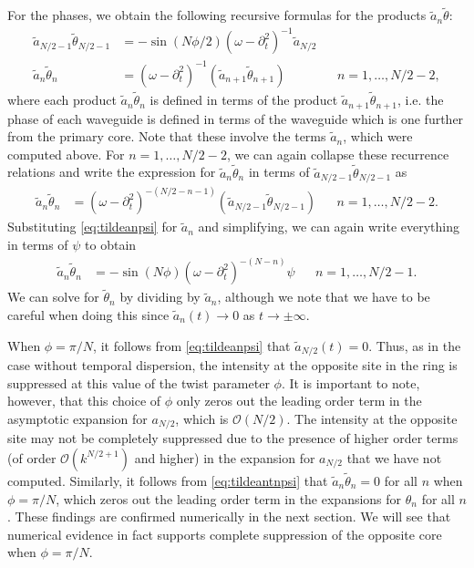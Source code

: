 \documentclass[11pt,reqno]{amsart}
\begin{document}
For the phases, we obtain the following recursive formulas for the products $\widetilde{a}_n\widetilde{\theta}$:
\begin{equation}\label{eq:tildeantn}
\begin{aligned}
\widetilde{a}_{N/2-1}\widetilde{\theta}_{N/2-1} &= -\sin(N \phi/2) (\omega - \partial_t^2)^{-1} \widetilde{a}_{N/2} \\
\widetilde{a}_n \widetilde{\theta}_n &= (\omega - \partial_t^2)^{-1} \left( \widetilde{a}_{n+1} \widetilde{\theta}_{n+1} \right) && n = 1, \dots, N/2-2,
\end{aligned}
\end{equation}
where each product $\widetilde{a}_n \widetilde{\theta}_n$ is defined in terms of the product $\widetilde{a}_{n+1} \widetilde{\theta}_{n+1}$, i.e. the phase of each waveguide is defined in terms of the waveguide which is one further from the primary core.
Note that these involve the terms $\widetilde{a}_n$, which were computed above. For $n = 1, \dots, N/2-2$, we can again collapse these recurrence relations and write the expression for $\widetilde{a}_n \widetilde{\theta}_n$ in terms of $\widetilde{a}_{N/2-1} \widetilde{\theta}_{N/2-1}$ as
\begin{align*}
\widetilde{a}_n \widetilde{\theta}_n &= (\omega - \partial_t^2)^{-(N/2-n-1)} \left( \widetilde{a}_{N/2-1} \widetilde{\theta}_{N/2-1} \right) && n = 1, \dots, N/2-2.
\end{align*}
Substituting \cref{eq:tildeanpsi} for $\widetilde{a}_n$ and simplifying, we can again write everything in terms of $\psi$ to obtain
\begin{equation}\label{eq:tildeantnpsi}
\begin{aligned}
\widetilde{a}_n \widetilde{\theta}_n &= -\sin(N \phi) (\omega - \partial_t^2)^{-(N-n)} \psi && n = 1, \dots, N/2-1.
\end{aligned}
\end{equation}
We can solve for $\widetilde{\theta}_n$ by dividing by $\widetilde{a}_n$, although we note that we have to be careful when doing this since $\widetilde{a}_n(t) \rightarrow 0$ as $t \rightarrow \pm \infty$.

When $\phi = \pi/N$, it follows from \cref{eq:tildeanpsi} that $\widetilde{a}_{N/2}(t) = 0$. Thus, as in the case without temporal dispersion, the intensity at the opposite site in the ring is suppressed at this value of the twist parameter $\phi$. It is important to note, however, that this choice of $\phi$ only zeros out the leading order term in the asymptotic expansion for $a_{N/2}$, which is $\mathcal{O}(N/2)$. The intensity at the opposite site may not be completely suppressed due to the presence of higher order terms (of order $\mathcal{O}(k^{N/2+1})$ and higher) in the expansion for $a_{N/2}$ that we have not computed. Similarly, it follows from \cref{eq:tildeantnpsi} that $\widetilde{a}_n \widetilde{\theta}_n = 0$ for all $n$ when $\phi = \pi/N$, which zeros out the leading order term in the expansions for $\theta_n$ for all $n$. These findings are confirmed numerically in the next section. We will see that numerical evidence in fact supports complete suppression of the opposite core when $\phi = \pi/N$.
\end{document}
